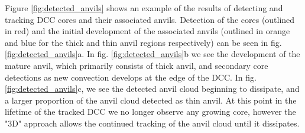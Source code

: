 \documentclass[amt, manuscript]{copernicus}
\begin{document}
Figure \ref{fig:detected_anvils} shows an example of the results of detecting and tracking DCC cores and their associated anvils.
Detection of the cores (outlined in red) and the initial development of the associated anvils (outlined in orange and blue for the thick and thin anvil regions respectively) can be seen in fig. \ref{fig:detected_anvils}a.
In fig. \ref{fig:detected_anvils}b we see the development of the mature anvil, which primarily consists of thick anvil, and secondary core detections as new convection develops at the edge of the DCC.
In fig. \ref{fig:detected_anvils}c, we see the detected anvil cloud beginning to dissipate, and a larger proportion of the anvil cloud detected as thin anvil.
At this point in the lifetime of the tracked DCC we no longer observe any growing core, however the "3D" approach allows the continued tracking of the anvil cloud until it dissipates.

\end{document}
